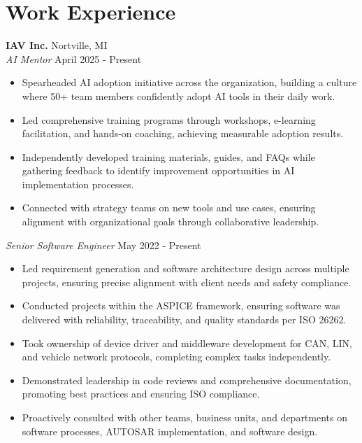 \section*{Work Experience}

\noindent
\textbf{IAV Inc.} \hfill Nortville, MI \\
\textit{AI Mentor} \hfill April 2025 - Present \\
\begin{itemize}[leftmargin=*,noitemsep,topsep=3pt]
    \item Spearheaded AI adoption initiative across the organization, building a culture where 50+ team members confidently adopt AI tools in their daily work.
    \item Led comprehensive training programs through workshops, e-learning facilitation, and hands-on coaching, achieving measurable adoption results.
    \item Independently developed training materials, guides, and FAQs while gathering feedback to identify improvement opportunities in AI implementation processes.
    \item Connected with strategy teams on new tools and use cases, ensuring alignment with organizational goals through collaborative leadership.
\end{itemize}

\vspace{0.5em}

\noindent
\textit{Senior Software Engineer} \hfill May 2022 - Present \\
\begin{itemize}[leftmargin=*,noitemsep,topsep=3pt]
    \item Led requirement generation and software architecture design across multiple projects, ensuring precise alignment with client needs and safety compliance.
    \item Conducted projects within the ASPICE framework, ensuring software was delivered with reliability, traceability, and quality standards per ISO 26262.
    \item Took ownership of device driver and middleware development for CAN, LIN, and vehicle network protocols, completing complex tasks independently.
    \item Demonstrated leadership in code reviews and comprehensive documentation, promoting best practices and ensuring ISO compliance.
    \item Proactively consulted with other teams, business units, and departments on software processes, AUTOSAR implementation, and software design.
\end{itemize}